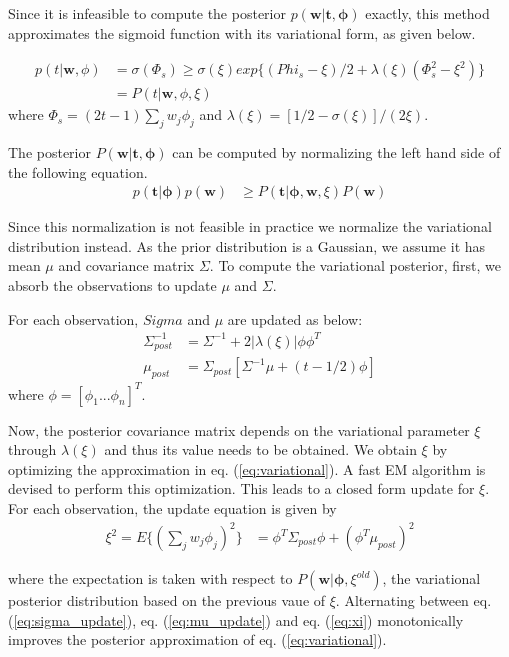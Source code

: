 Since it is infeasible to compute the posterior $p(\bm{w} | \bm{t}, \bm{\phi})$ exactly, this method approximates the sigmoid function with its variational form, as given below.

\begin{align}
  p(t | \bm{w}, \phi) &= \sigma(\Phi_s) \geq \sigma(\xi) exp\{(Phi_s - \xi)/2 + \lambda(\xi)(\Phi_s^2 - \xi^2)\} \\
  &= P(t | \bm{w}, \phi, \xi)
\end{align}
where $\Phi_s = (2t - 1)\sum_jw_j\phi_j$ and $\lambda(\xi) = [1/2 - \sigma(\xi)]/(2\xi)$.

The posterior $P(\bm{w}|\bm{t}, \bm{\phi})$ can be computed by normalizing the left hand side of the following equation.
\begin{align}
\label{eq:variational}
p(\bm{t}|\bm{\phi})p(\bm{w}) &\geq P(\bm{t}|\bm{\phi}, \bm{w}, \xi)P(\bm{w})
\end{align}

Since this normalization is not feasible in practice we normalize the variational distribution instead. As the prior distribution is a Gaussian, we assume it has mean $\mu$ and covariance matrix $\Sigma$. To compute the variational posterior, first, we absorb the observations to update $\mu$ and $\Sigma$.

For each observation, $Sigma$ and $\mu$ are updated as below: 
\begin{align}
\label{eq:sigma_update}
\Sigma^{-1}_{post} &= \Sigma^{-1} + 2|\lambda(\xi)|\phi\phi^T\\
\label{eq:mu_update}
\mu_{post} &= \Sigma_{post}[\Sigma^{-1}\mu + (t - 1/2)\phi]
\end{align}
where $\phi = [\phi_1 ...\phi_n]^T$. 

Now, the posterior covariance matrix depends on the variational parameter $\xi$ through $\lambda(\xi)$ and thus its value needs to be obtained. We obtain $\xi$ by optimizing the approximation in eq. (\ref{eq:variational}). A fast EM algorithm is devised to perform this optimization. This leads to a closed form update for $\xi$. For each observation, the update equation is given by 
\begin{align}
\label{eq:xi}
\xi^2 = E\{(\sum_jw_j\phi_j)^2\} &= \phi^T\Sigma_{post}\phi + (\phi^T\mu_{post})^2
\end{align}

where the expectation is taken with respect to $P(\bm{w}|\bm{\phi}, \xi^{old})$, the variational posterior distribution based on the previous vaue of $\xi$. Alternating between eq. (\ref{eq:sigma_update}), eq. (\ref{eq:mu_update}) and eq. (\ref{eq:xi}) monotonically improves the posterior approximation of eq. (\ref{eq:variational}).

